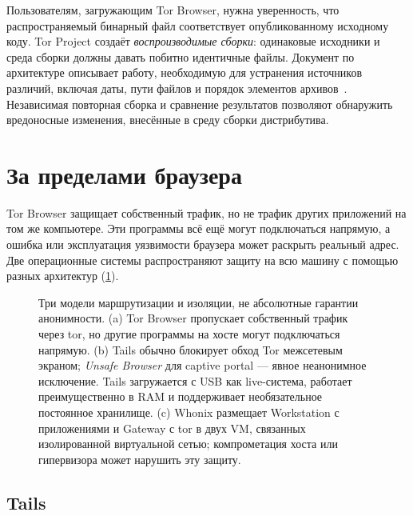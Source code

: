 \begin{approfondimento}
Пользователям, загружающим Tor Browser, нужна уверенность, что распространяемый бинарный файл соответствует опубликованному исходному коду. Tor Project создаёт \emph{воспроизводимые сборки}: одинаковые исходники и среда сборки должны давать побитно идентичные файлы. Документ по архитектуре описывает работу, необходимую для устранения источников различий, включая даты, пути файлов и порядок элементов архивов~\cite{perry2018torbrowser}. Независимая повторная сборка и сравнение результатов позволяют обнаружить вредоносные изменения, внесённые в среду сборки дистрибутива.
\end{approfondimento}

\section{За пределами браузера}\label{sec:browser-sistemi}

Tor Browser защищает собственный трафик, но не трафик других приложений на том же компьютере. Эти программы всё ещё могут подключаться напрямую, а ошибка или эксплуатация уязвимости браузера может раскрыть реальный адрес. Две операционные системы распространяют защиту на всю машину с помощью разных архитектур (\cref{fig:architetture}).

\begin{figure}[htbp]
\centering

\caption{Три модели маршрутизации и изоляции, не абсолютные гарантии анонимности. (a) Tor Browser пропускает собственный трафик через tor, но другие программы на хосте могут подключаться напрямую. (b) Tails обычно блокирует обход Tor межсетевым экраном; \emph{Unsafe Browser} для captive portal — явное неанонимное исключение. Tails загружается с USB как live-система, работает преимущественно в RAM и поддерживает необязательное постоянное хранилище. (c) Whonix размещает Workstation с приложениями и Gateway с tor в двух VM, связанных изолированной виртуальной сетью; компрометация хоста или гипервизора может нарушить эту защиту.}
\label{fig:architetture}
\end{figure}

\subsection{Tails}

